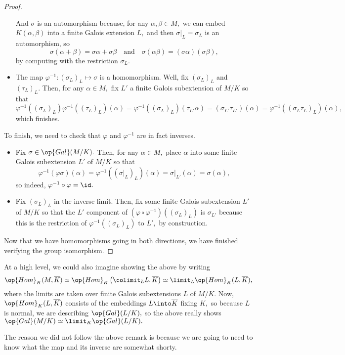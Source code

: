 \begin{proof}
\begin{itemize}
		And $\sigma$ is an automorphism because, for any $\alpha,\beta\in M,$ we can embed $K(\alpha,\beta)$ into a finite Galois extension $L,$ and then $\sigma|_L=\sigma_L$ is an automorphism, so
		\[\sigma(\alpha+\beta)=\sigma\alpha+\sigma\beta\quad\text{and}\quad\sigma(\alpha\beta)=(\sigma\alpha)(\sigma\beta),\]
		by computing with the restriction $\sigma_L.$
		\item The map $\varphi^{-1}:(\sigma_L)_L\mapsto\sigma$ is a homomorphism. Well, fix $(\sigma_L)_L$ and $(\tau_L)_L.$ Then, for any $\alpha\in M,$ fix $L'$ a finite Galois subextension of $M/K$ so that
		\[\varphi^{-1}\left((\sigma_L)_L\right)\varphi^{-1}\left((\tau_L)_L\right)(\alpha)=\varphi^{-1}\left((\sigma_L)_L\right)(\tau_{L'}\alpha)=(\sigma_{L'}\tau_{L'})(\alpha)=\varphi^{-1}\left((\sigma_L\tau_L)_L\right)(\alpha),\]
		which finishes.
	\end{itemize}
	To finish, we need to check that $\varphi$ and $\varphi^{-1}$ are in fact inverses.
	\begin{itemize}
		\item Fix $\sigma\in\op{Gal}(M/K).$ Then, for any $\alpha\in M,$ place $\alpha$ into some finite Galois subextension $L'$ of $M/K$ so that
		\[\varphi^{-1}(\varphi\sigma)(\alpha)=\varphi^{-1}\left((\sigma|_L)_L\right)(\alpha)=\sigma|_{L'}(\alpha)=\sigma(\alpha),\]
		so indeed, $\varphi^{-1}\circ\varphi=\id.$
		\item Fix $(\sigma_L)_L$ in the inverse limit. Then, fix some finite Galois subextension $L'$ of $M/K$ so that the $L'$ component of $\left(\varphi\circ\varphi^{-1}\right)\left((\sigma_L)_L\right)$ is $\sigma_{L'}$ because this is the restriction of $\varphi^{-1}\left((\sigma_L)_L\right)$ to $L',$ by construction.
	\end{itemize}
	Now that we have homomorphisms going in both directions, we have finished verifying the group isomorphism.
\end{proof}
\begin{remark} \label{rem:krullprofiniteintuition}
	At a high level, we could also imagine showing the above by writing
	\[\op{Hom}_K(M,\overline K)\simeq\op{Hom}_K\left(\colimit_LL,\overline K\right)\simeq\limit_L\op{Hom}_K(L,\overline K),\]
	where the limits are taken over finite Galois subextensions $L$ of $M/K.$ Now, $\op{Hom}_K(L,\overline K)$ consists of the embeddings $L\into\overline K$ fixing $K,$ so because $L$ is normal, we are describing $\op{Gal}(L/K),$ so the above really shows $\op{Gal}(M/K)\simeq\limit_K\op{Gal}(L/K).$
\end{remark}
The reason we did not follow the above remark is because we are going to need to know what the map and its inverse are somewhat shorty.


